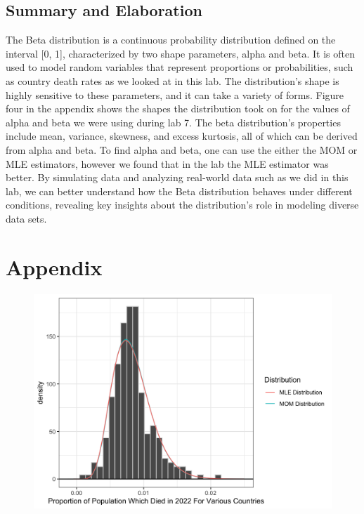 \documentclass{article}\usepackage[]{graphicx}\usepackage[]{xcolor}
\begin{document}
\begin{multicols}{2}
\section{Summary and Elaboration}
The Beta distribution is a continuous probability distribution defined on the interval [0, 1], characterized by two shape parameters, alpha and beta. It is often used to model random variables that represent proportions or probabilities, such as country death rates as we looked at in this lab. The distribution’s shape is highly sensitive to these parameters, and it can take a variety of forms. Figure four in the appendix shows the shapes the distribution took on for the values of alpha and beta we were using during lab 7. The beta distribution's properties include  mean, variance, skewness, and excess kurtosis, all of which can be derived from alpha and beta. To find alpha and beta, one can use the either the MOM or MLE estimators, however we found that in the lab the MLE estimator was better. By simulating data and analyzing real-world data such as we did in this lab, we can better understand how the Beta distribution behaves under different conditions, revealing key insights about the distribution’s role in modeling diverse data sets.

\vspace{2em}
\nocite{tidyverse}
\nocite{patchwork}
\nocite{cumstats}

\begin{tiny}

\end{tiny}
\end{multicols}

\onecolumn
\section{Appendix}

\begin{figure}[!htbp]
    \centering
    \includegraphics[width=.75\textwidth]{Rplot06.png}
    \caption{}
    \label{fig:first}
\end{figure}
\end{document}
